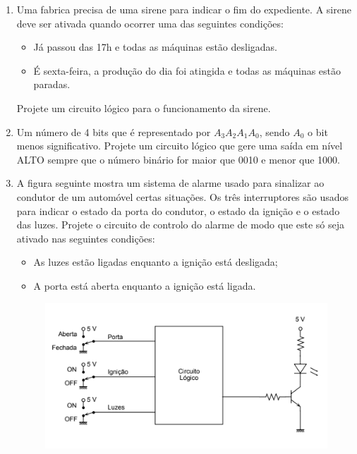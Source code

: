 \documentclass[12pt,onepage,a4paper]{memoir}
\begin{document}
\begin{enumerate}
    \item Uma fabrica precisa de uma sirene para indicar o fim do expediente. A sirene deve ser ativada quando ocorrer uma das seguintes condições:
    \begin{itemize}
        \item Já passou das 17h e todas as máquinas estão desligadas.
        \item É sexta-feira, a produção do dia foi atingida e todas as máquinas estão paradas.
    \end{itemize}
    Projete um circuito lógico para o funcionamento da sirene.

    \item Um número de 4 bits que é representado por $A_{3}A_{2}A_{1}A_{0}$, sendo $A_{0}$ o bit menos significativo. Projete um circuito lógico que gere uma saída em nível ALTO sempre que o número binário for maior que 0010 e menor que 1000. 

    \item A figura seguinte mostra um sistema de alarme usado para sinalizar ao condutor de um automóvel certas situações. Os três interruptores são usados para indicar o estado da porta do condutor, o estado da ignição e o estado das luzes. Projete o circuito de controlo do alarme de modo que este só seja ativado nas seguintes condições:
    \begin{itemize}
        \item As luzes estão ligadas enquanto a ignição está desligada;
        \item A porta está aberta enquanto a ignição está ligada.
    \end{itemize}

    \begin{figure}[H]
        \centering
        \includegraphics[scale=0.6]{fig/ignicao.png}
        \label{fig:ignicao}
    \end{figure}



\end{enumerate}
\end{document}
